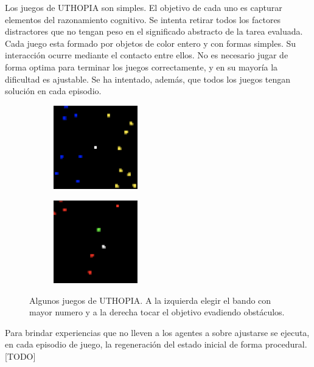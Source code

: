 Los juegos de UTHOPIA son simples. El objetivo de cada uno es capturar elementos del razonamiento cognitivo. Se intenta retirar todos los factores distractores que no tengan peso en el significado abstracto de la tarea evaluada. Cada juego esta formado por objetos de color entero y con formas simples. Su interacción ocurre mediante el contacto entre ellos. No es necesario jugar de forma optima para terminar los juegos correctamente, y en su mayoría la dificultad es ajustable. Se ha intentado, además, que todos los juegos tengan solución en cada episodio. 

\begin{figure}[ht!]
    \centering
    \begin{subfigure}
      \centering
      \includegraphics[width=0.4\textwidth]{Graphics/uthopia_count_war_1.png}
      \label{fig:uthopia1}
    \end{subfigure}%
    \begin{subfigure}
      \centering
      \includegraphics[width=0.4\textwidth]{Graphics/uthopia_evade_1.png}
      \label{fig:uthopia2}
    \end{subfigure}%
    \caption{Algunos juegos de UTHOPIA. A la izquierda elegir el bando con mayor numero y a la derecha tocar el objetivo evadiendo obstáculos.}
    \label{fig:uthopia}
\end{figure}

Para brindar experiencias que no lleven a los agentes a sobre ajustarse se ejecuta, en cada episodio de juego, la regeneración del estado inicial de forma procedural. [TODO]

